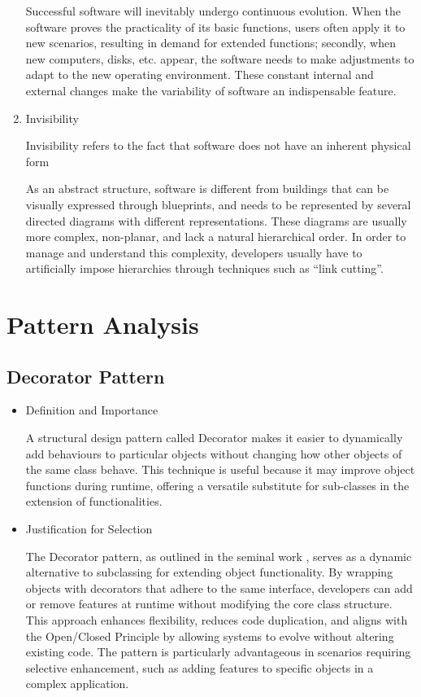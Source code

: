 \documentclass[11pt]{article}
\begin{document}
\begin{enumerate}
   Successful software will inevitably undergo continuous evolution. When the software proves the practicality of its basic functions, users often apply it to new scenarios, resulting in demand for extended functions; secondly, when new computers, disks, etc. appear, the software needs to make adjustments to adapt to the new operating environment. These constant internal and external changes make the variability of software an indispensable feature. 

\item Invisibility

Invisibility refers to the fact that software does not have an inherent physical form

   As an abstract structure, software is different from buildings that can be visually expressed through blueprints, and needs to be represented by several directed diagrams with different representations. These diagrams are usually more complex, non-planar, and lack a natural hierarchical order. In order to manage and understand this complexity, developers usually have to artificially impose hierarchies through techniques such as ``link cutting''.
\end{enumerate}

\section{Pattern Analysis}

\subsection{Decorator Pattern}
\begin{itemize}
\item Definition and Importance

A structural design pattern called Decorator makes it easier to dynamically add behaviours to particular objects without changing how other objects of the same class behave. This technique is useful because it may improve object functions during runtime, offering a versatile substitute for sub-classes in the extension of functionalities.

\item Justification for Selection

The Decorator pattern, as outlined in the seminal work \cite{brooks1987no}, serves as a dynamic alternative to subclassing for extending object functionality. By wrapping objects with decorators that adhere to the same interface, developers can add or remove features at runtime without modifying the core class structure. This approach enhances flexibility, reduces code duplication, and aligns with the Open/Closed Principle by allowing systems to evolve without altering existing code. The pattern is particularly advantageous in scenarios requiring selective enhancement, such as adding features to specific objects in a complex application.
\end{itemize}
\end{document}
